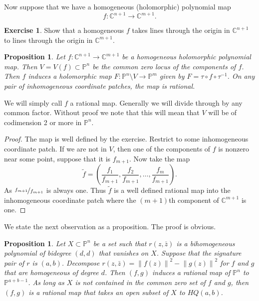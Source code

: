 \documentclass[12pt,openany]{book}
\newcommand{\norm}[1]{\left\lVert {#1} \right\rVert}
\newcommand{\C}{{\mathbb{C}}}
\newcommand{\bP}{{\mathbb{P}}}
\theoremstyle{plain}
\newtheorem{prop}[thm]{Proposition}
\theoremstyle{remark}
\theoremstyle{definition}
\theoremstyle{exercise}
\newtheorem{exercise}{Exercise}[section]
\theoremstyle{example}
\begin{document}
Now suppose that we have a homogeneous (holomorphic) polynomial map
\begin{equation}
f \colon \C^{n+1} \to \C^{m+1} .
\end{equation}

\begin{exercise}
Show that a homogeneous $f$ takes lines through the origin in $\C^{n+1}$ to
lines through the origin in $\C^{m+1}$.
\end{exercise}

\begin{prop}
Let  $f \colon \C^{n+1} \to \C^{m+1}$ be a homogeneous holomorphic polynomial
map.  Then $V = V(f) \subset \bP^n$ be the common zero locus of the components
of $f$.  Then $f$ induces a holomorphic map $F \colon \bP^n \setminus V \to
\bP^m$ given by
$F = \tau \circ f \circ \tau^{-1}$.  On any pair of inhomogeneous coordinate
patches, the map is rational.
\end{prop}

We will simply call $f$ a rational map.  Generally we will divide through by
any common factor.  Without proof we note that this will mean that $V$ will be
of codimension 2 or more in $\bP^n$.

\begin{proof}
The map is well defined by the exercise.  Restrict to
some inhomogeneous coordinate patch.  If we are not in $V$,
then one of the components of $f$ is nonzero near some point, suppose that it is
$f_{m+1}$.  Now take the map
\begin{equation}
\tilde{f} = 
\left(
\frac{f_1}{f_{m+1}} ,
\frac{f_2}{f_{m+1}} ,
\ldots,
\frac{f_m}{f_{m+1}} 
\right) .
\end{equation}
As
$\nicefrac{f_{m+1}}{f_{m+1}}$ is always one.  Thus $\tilde{f}$ is a well
defined rational map into the inhomogeneous coordinate patch where the
$(m+1)$th component of $\C^{m+1}$ is one.
\end{proof}

We state the next observation as a proposition.  The proof is obvious.

\begin{prop}
Let $X \subset \bP^n$ be a set such that $r(z,\bar{z})$ is a bihomogeneous
polynomial of bidegree $(d,d)$ that vanishes on $X$.  Suppose that the signature pair of $r$
is $(a,b)$.  Decompose $r(z,\bar{z}) = \norm{f(z)}^2 - \norm{g(z)}^2$
for $f$ and $g$ that are homogeneous of degree $d$.  Then $(f,g)$ induces
a rational map of $\bP^n$ to $\bP^{a+b-1}$.  As long as $X$ is not contained
in the common zero set of $f$ and $g$, then $(f,g)$ is a rational
map that takes an open subset of $X$ to $HQ(a,b)$.
\end{prop}
\end{document}
